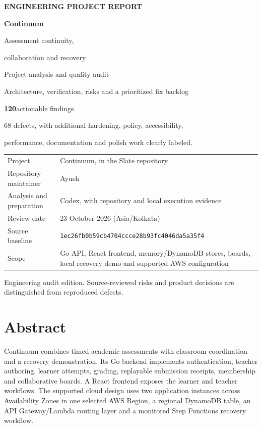 \documentclass[11pt,a4paper]{article}
\begin{document}
\hypersetup{pageanchor=false}
\begin{titlepage}\thispagestyle{empty}
{\small\bfseries\color{teal}ENGINEERING PROJECT REPORT}\par
\vspace{20mm}
{\fontsize{40}{44}\selectfont\bfseries\color{navy}Continuum}\par
\vspace{4mm}
{\LARGE\color{navy}Assessment continuity,\par collaboration and recovery}\par
\vspace{12mm}
{\Large Project analysis and quality audit}\par
{\large Architecture, verification, risks and a prioritized fix backlog}\par
\vspace{14mm}
\begin{note}
{\fontsize{30}{34}\selectfont\bfseries\color{teal}120}\quad actionable findings\par
68 defects, with additional hardening, policy, accessibility,\par performance, documentation and polish work clearly labeled.
\end{note}\vfill
\begin{tabularx}{\textwidth}{@{}lX@{}}
Project & Continuum, in the Slate repository \\
Repository maintainer & Ayush \\
Analysis and preparation & Codex, with repository and local execution evidence \\
Review date & 23 October 2026 (Asia/Kolkata) \\
Source baseline & \texttt{1ec26fb0b59cb4704ccce28b93fc4046da5a35f4} \\
Scope & Go API, React frontend, memory/DynamoDB stores, boards, local recovery demo and supported AWS configuration \\
\end{tabularx}\vspace{8mm}
{\small\color{muted}Engineering audit edition. Source-reviewed risks and product decisions are distinguished from reproduced defects.}
\end{titlepage}
\hypersetup{pageanchor=true}

\section*{Abstract}
Continuum combines timed academic assessments with classroom coordination and a recovery demonstration. Its Go backend implements authentication, teacher authoring, learner attempts, grading, replayable submission receipts, membership and collaborative boards. A React frontend exposes the learner and teacher workflows. The supported cloud design uses two application instances across Availability Zones in one selected AWS Region, a regional DynamoDB table, an API Gateway/Lambda routing layer and a monitored Step Functions recovery workflow.
\end{document}
